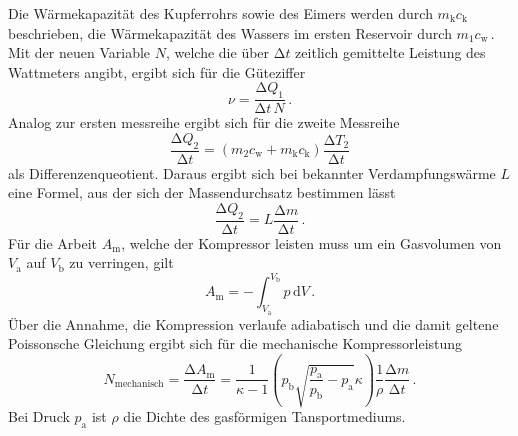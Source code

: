 Die Wärmekapazität des Kupferrohrs sowie des Eimers werden durch $m_\text{k}c_\text{k}$ beschrieben,
die Wärmekapazität des Wassers im ersten Reservoir durch $m_1c_\text{w}$\,.
Mit der neuen Variable $N$, welche die über $\increment t$ zeitlich gemittelte Leistung des 
Wattmeters angibt, ergibt sich für die Güteziffer 
\begin{equation}
    \nu=\frac{\increment Q_1}{\increment t\,N}\,.
    \label{eq:Guetereal}
\end{equation}
Analog zur ersten messreihe ergibt sich für die zweite Messreihe
\begin{equation}
    \frac{\increment Q_2}{\increment t}=(m_2c_\text{w}+m_\text{k}c_\text{k})\frac{\increment T_2}{\increment t}
\end{equation}
als Differenzenqueotient. Daraus ergibt sich bei bekannter Verdampfungswärme $L$ eine Formel,
aus der sich der Massendurchsatz bestimmen lässt
\begin{equation}
    \frac{\increment Q_2}{\increment t}=L\frac{\increment m}{\increment t}\,.
    \label{eq:massendurchsatz}
\end{equation}
Für die Arbeit $A_\text{m}$, welche der Kompressor leisten muss um ein Gasvolumen von $V_\text{a}$
auf $V_\text{b}$ zu verringen, gilt 
\begin{equation}
    A_\text{m}=-\int_{V_\text{a}}^{V_\text{b}}p \,\text{d} V\,.
\end{equation}
Über die Annahme, die Kompression verlaufe adiabatisch und die damit geltene Poissonsche Gleichung
ergibt sich für die mechanische Kompressorleistung
\begin{equation}
N_\text{mechanisch}=\frac{\increment A_\text{m}}{\increment t}=\frac{1}{\kappa-1}\left(p_\text{b}
\sqrt{\frac{p_\text{a}}{p_\text{b}}-p_\text{a}}{\kappa}\right)\frac{1}{\rho}\frac{\increment m}{\increment t}\,.
\label{eq:mechanisch}
\end{equation}
Bei Druck $p_\text{a}$ ist $\rho$ die Dichte des gasförmigen Tansportmediums.

